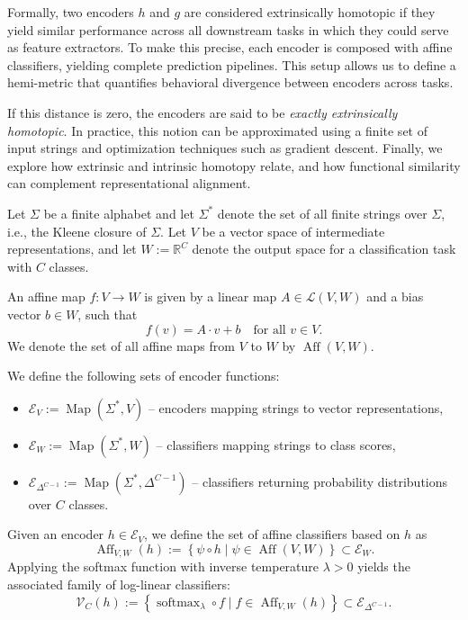 Formally, two encoders \( h \) and \( g \) are considered extrinsically homotopic if they yield similar performance across all downstream tasks in which they could serve as feature extractors.  
To make this precise, each encoder is composed with affine classifiers, yielding complete prediction pipelines.  
This setup allows us to define a hemi-metric that quantifies behavioral divergence between encoders across tasks.

If this distance is zero, the encoders are said to be \emph{exactly extrinsically homotopic}.  
In practice, this notion can be approximated using a finite set of input strings and optimization techniques such as gradient descent.  
Finally, we explore how extrinsic and intrinsic homotopy relate, and how functional similarity can complement representational alignment.


Let $\Sigma$ be a finite alphabet and let $\Sigma^*$ denote the set of all finite strings over $\Sigma$, i.e., the Kleene closure of $\Sigma$.  
Let $V$ be a vector space of intermediate representations, and let $W := \mathbb{R}^C$ denote the output space for a classification task with $C$ classes.

An affine map $f: V \to W$ is given by a linear map $A \in \mathcal{L}(V, W)$ and a bias vector $b \in W$, such that
\[
f(v) = A \cdot v + b \quad \text{for all } v \in V.
\]
We denote the set of all affine maps from $V$ to $W$ by $\operatorname{Aff}(V, W)$.

We define the following sets of encoder functions:
\begin{itemize}
	\item $\mathcal{E}_V := \operatorname{Map}(\Sigma^*, V)$ – encoders mapping strings to vector representations,
	\item $\mathcal{E}_W := \operatorname{Map}(\Sigma^*, W)$ – classifiers mapping strings to class scores,
	\item $\mathcal{E}_{\Delta^{C-1}} := \operatorname{Map}(\Sigma^*, \Delta^{C-1})$ – classifiers returning probability distributions over $C$ classes.
\end{itemize}

Given an encoder $h \in \mathcal{E}_V$, we define the set of affine classifiers based on $h$ as
\[
\operatorname{Aff}_{V,W}(h) := \left\{ \psi \circ h \mid \psi \in \operatorname{Aff}(V, W) \right\} \subset \mathcal{E}_W.
\]
Applying the softmax function with inverse temperature $\lambda > 0$ yields the associated family of log-linear classifiers:
\[
\mathcal{V}_C(h) := \left\{ \operatorname{softmax}_\lambda \circ f \mid f \in \operatorname{Aff}_{V,W}(h) \right\} \subset \mathcal{E}_{\Delta^{C-1}}.
\]

